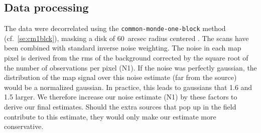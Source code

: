 




\subsection{Data processing}

The data were decorrelated using the {\tt common-monde-one-block} method
(cf.~\ref{se:cm1blck}), masking a disk of 60~arcsec radius centered \hls.  The
scans have been combined with standard inverse noise weighting. The noise in
each map pixel is derived from the rms of the background corrected by the square
root of the number of observations per pixel (N1). If the noise was perfectly
gaussian, the distribution of the map signal over this noise estimate (far from
the source) would be a normalized gaussian. In practice, this leads to gaussians
that 1.6 and 1.5 larger. We therefore increase our noise estimate (N1) by these
factors to derive our final estimates. Should the extra sources that pop up in
the field contribute to this estimate, they would only make our estimate more
conservative.

